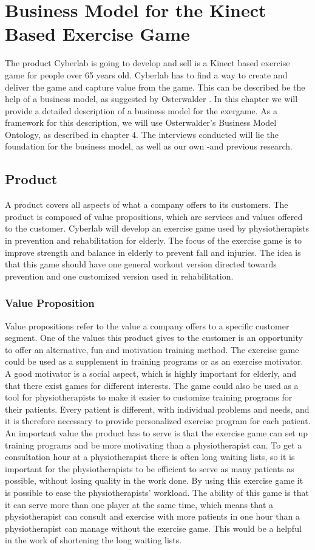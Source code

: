 \chapter{Business Model for the Kinect Based Exercise Game}
The product Cyberlab is going to develop and sell is a Kinect based exercise game for people over 65 years old. Cyberlab has to find a way to create and deliver the game and capture value from the game. This can be described be the help of a business model, as suggested by Osterwalder \cite{osterwalder}. In this chapter we will provide a detailed description of a business model for the exergame. As a framework for this description, we will use Osterwalder's Business Model Ontology, as described in chapter 4. The interviews conducted will lie the foundation for the business model, as well as our own -and previous research. 

\section{Product}
A product covers all aspects of what a company offers to its customers. The product is composed of value propositions, which are services and values offered to the customer. Cyberlab will develop an exercise game used by physiotherapists in prevention and rehabilitation for elderly. The focus of the exercise game is to improve strength and balance in elderly to prevent fall and injuries. The idea is that this game should have one general workout version directed towards prevention and one customized version used in rehabilitation.
\subsection{Value Proposition}
Value propositions refer to the value a company offers to a specific customer segment. One of the values this product gives to the customer is an opportunity to offer an alternative, fun and motivation training method. The exercise game could be used as a supplement in training programs or as an exercise motivator. A good motivator is a social aspect, which is highly important for elderly, and that there exist games for different interests. The game could also be used as a tool for physiotherapists to make it easier to customize training programs for their patients. Every patient is different, with individual problems and needs, and it is therefore necessary to provide personalized exercise program for each patient. An important value the product has to serve is that the exercise game can set up training programs and be more motivating than a physiotherapist can. To get a consultation hour at a physiotherapist there is often long waiting lists, so it is important for the physiotherapists to be efficient to serve as many patients as possible, without losing quality in the work done. By using this exercise game it is possible to ease the physiotherapists’ workload. The ability of this game is that it can serve more than one player at the same time, which means that a physiotherapist can consult and exercise with more patients in one hour than a physiotherapist can manage without the exercise game. This would be a helpful in the work of shortening the long waiting lists.

